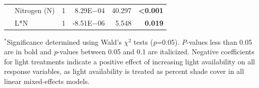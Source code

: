 \begin{table}[]
\begin{tabular}{p{0.1cm}p{2.5cm}p{0.5cm}p{1.75cm}p{1.5cm}p{1.5cm}}
         & Nitrogen (N)
         & \multicolumn{1}{r}{1} 
         & \multicolumn{1}{r}{8.29E$-$04}    & \multicolumn{1}{r}{40.297}    & \multicolumn{1}{r}{\textbf{<0.001}}
         \\
         
         & L*N
         & \multicolumn{1}{r}{1}            
         & \multicolumn{1}{r}{-8.51E$-$06}     & \multicolumn{1}{r}{5.548}     & \multicolumn{1}{r}{\textbf{0.019}} \\
         \hline

        \end{tabular}%
    \end{table}
\begin{singlespace}
    \noindent $^*$Significance determined using Wald’s $\chi^2$ tests (\textit{p}=0.05). \textit{P}-values less than 0.05 are in bold and \textit{p}-values between 0.05 and 0.1 are italicized. Negative coefficients for light treatments indicate a positive effect of increasing light availability on all response variables, as light availability is treated as percent shade cover in all linear mixed-effects models.
\end{singlespace}
\clearpage

